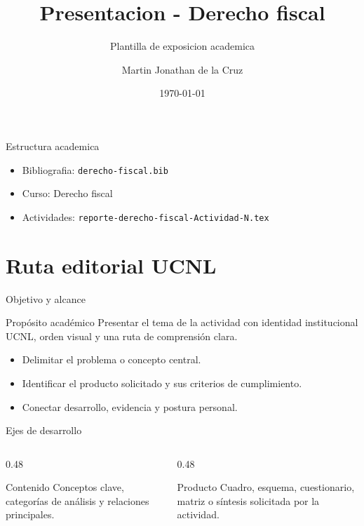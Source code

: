 ﻿\documentclass[spanish,aspectratio=169]{beamer}
\title{Presentacion - Derecho fiscal}
\subtitle{Plantilla de exposicion academica}
\author{Martin Jonathan de la Cruz}
\institute{Universidad Ciudadana de Nuevo Leon}
\date{\today}
\begin{document}
\begin{frame}
  \titlepage
\end{frame}

\begin{frame}{Estructura academica}
  \begin{itemize}
    \item Bibliografia: \texttt{derecho-fiscal.bib}
    \item Curso: Derecho fiscal
    \item Actividades: \texttt{reporte-derecho-fiscal-Actividad-N.tex}
  \end{itemize}
\end{frame}


\section{Ruta editorial UCNL}

\begin{frame}{Objetivo y alcance}
  \begin{block}{Propósito académico}
    Presentar el tema de la actividad con identidad institucional UCNL, orden visual y una ruta de comprensión clara.
  \end{block}
  \begin{itemize}
    \item Delimitar el problema o concepto central.
    \item Identificar el producto solicitado y sus criterios de cumplimiento.
    \item Conectar desarrollo, evidencia y postura personal.
  \end{itemize}
\end{frame}

\begin{frame}{Ejes de desarrollo}
  \begin{columns}[T,totalwidth=\textwidth]
    \begin{column}{0.48\textwidth}
      \begin{block}{Contenido}
        Conceptos clave, categorías de análisis y relaciones principales.
      \end{block}
    \end{column}
    \begin{column}{0.48\textwidth}
      \begin{block}{Producto}
        Cuadro, esquema, cuestionario, matriz o síntesis solicitada por la actividad.
      \end{block}
    \end{column}
  \end{columns}
\end{frame}
\end{document}
